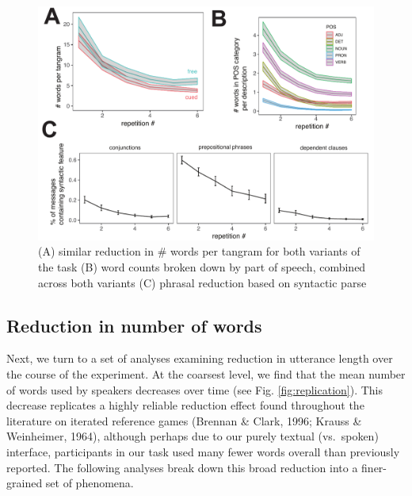 \documentclass[alpha-refs]{wiley-article}
\begin{document}
\begin{figure}[t]
\includegraphics[scale=.65]{reduction.pdf}
\caption{(A) similar reduction in \# words per tangram for both variants of the task (B) word counts broken down by part of speech, combined across both variants (C) phrasal reduction based on syntactic parse }
\label{fig:reduction}
\end{figure}

\subsection{Reduction in number of words}\label{reduction}

Next, we turn to a set of analyses examining reduction in utterance length over the course of the experiment. 
At the coarsest level, we find that the mean number of words used by speakers decreases over time (see Fig. \ref{fig:replication}). 
This decrease replicates a highly reliable reduction effect found throughout the literature on iterated reference games (Brennan \& Clark, 1996; Krauss \& Weinheimer, 1964), although perhaps due to our purely textual (vs.~spoken) interface, participants in our task used many fewer words overall than previously reported. 
The following analyses break down this broad reduction into a finer-grained set of phenomena.
\end{document}
